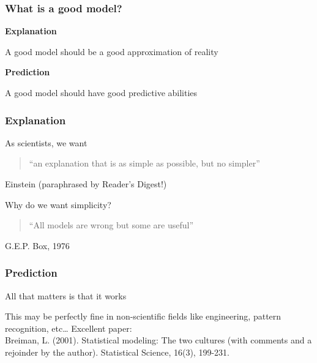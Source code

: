 \documentclass[color=usenames,dvipsnames]{beamer}\usepackage[]{graphicx}\usepackage[]{color}
\begin{document}
\begin{frame}
  \frametitle{What is a good model?}
  \Large
  {\bf Explanation \par}
  A good model should be a good approximation of reality \\
  \pause
  \vspace{0.5cm}
  {\bf Prediction \par}
  A good model should have good predictive abilities
\end{frame}





\begin{frame}
  \frametitle{Explanation}
  \Large
As scientists, we want
\begin{quote}
  ``an explanation that is as simple as possible, but no simpler''
\end{quote}
{\small \flushright Einstein (paraphrased by Reader's Digest!) \par}
\pause
\vspace{1cm}
Why do we want simplicity?
\pause
\begin{quote}
  ``All models are wrong but some are useful''
\end{quote}
{\small \flushright G.E.P. Box, 1976 \par}
\end{frame}



\begin{frame}
  \frametitle{Prediction}
  \Large
  All that matters is that it works \par
  \pause
  \vspace{1cm}
  This may be perfectly fine in non-scientific fields like
  engineering, pattern recognition, etc\dots
  \pause
  \vfill
  Excellent paper: \\
  \normalsize
  Breiman, L. (2001). Statistical modeling: The two cultures (with
  comments and a rejoinder by the author). Statistical Science, 16(3),
  199-231. \\
\end{frame}
\end{document}
